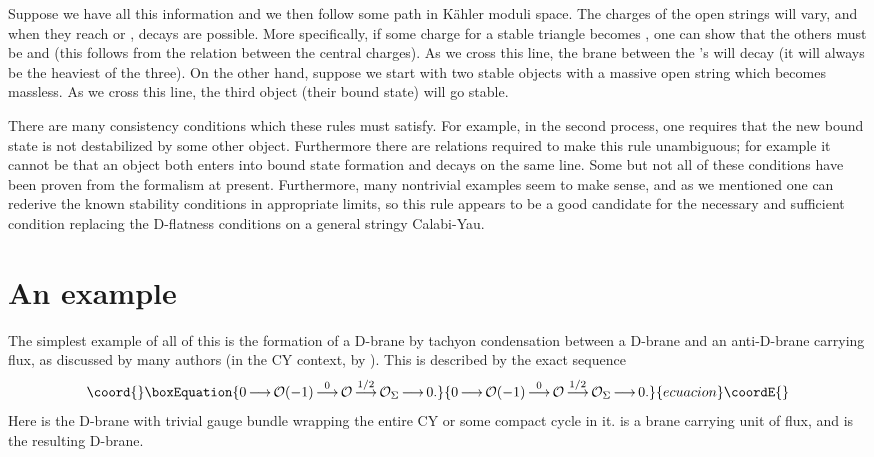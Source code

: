 \documentclass[a4paper,12pt]{amsart}
\numberwithin{equation}{section}
\theoremstyle{plain}
\theoremstyle{definition}
\def\mapr{\mathop{\longrightarrow}\limits}
\def\cal{\mathcal}
\def\CO{{\cal O}}
\begin{document}
Suppose we have all this information and we then follow some path in
K\"ahler moduli space.  The \coordHE{} charges of the open strings will
vary, and when they reach \coordHE{} or \coordHE{}, decays are possible.  More
specifically, if some \coordHE{} charge for a stable triangle becomes \coordHE{},
one can show that the others must be \coordHE{} and \coordHE{} (this follows from the
relation \coordHE{} between the central charges).  As we cross
this line, the brane between the \coordHE{}'s will decay (it will always be
the heaviest of the three).  On the other hand, suppose we start with
two stable objects with a massive open string \coordHE{} which becomes massless.
As we cross this line, the third object (their bound state) will go stable.

There are many consistency conditions which these rules must satisfy.
For example, in the second process, one requires that the new bound state
is not destabilized by some other object.  Furthermore there are relations
required to make this rule unambiguous; for example it cannot be that
an object both enters into bound state formation and decays on the same
line.  Some but not all of these conditions have been proven from the
formalism at present.  Furthermore, many nontrivial examples seem
to make sense, and as we mentioned one can rederive the known stability
conditions in appropriate limits, so this rule appears to be a good
candidate for the necessary and sufficient condition replacing the
D-flatness conditions on a general stringy Calabi-Yau.

\section{An example}

The simplest example of all of this is the formation of a D\coordHE{}-brane
by tachyon condensation between a D\coordHE{}-brane and an anti-D\coordHE{}-brane
carrying flux, as discussed by many authors (in the CY context, by
\cite{OPW}).  This is described by the exact sequence
\begin{equation}\coord{}\boxEquation{
0 \mapr \CO(-1) \mapr^0 \CO \mapr^{1/2} \CO_\Sigma \mapr 0 .
}{
0 \mapr \CO(-1) \mapr^0 \CO \mapr^{1/2} \CO_\Sigma \mapr 0 .
}{ecuacion}\coordE{}\end{equation}
Here \myHighlight{$\CO$}\coordHE{} is the D\coordHE{}-brane with trivial gauge bundle wrapping the entire
CY or some compact cycle in it.  \myHighlight{$\CO(-1)$}\coordHE{} is a brane carrying \coordHE{} unit
of flux, and \myHighlight{$\CO_\Sigma$}\coordHE{} is the resulting D\coordHE{}-brane.
\end{document}

